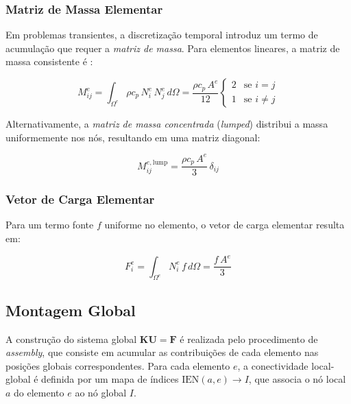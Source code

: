 \subsubsection{Matriz de Massa Elementar}

Em problemas transientes, a discretização temporal introduz um termo de acumulação que requer a \textit{matriz de massa}. Para elementos lineares, a matriz de massa consistente é \cite{Zienkiewicz2013}:

\begin{equation}
M_{ij}^e = \int_{\Omega^e} \rho c_p \, N_i^e \, N_j^e \, d\Omega = \frac{\rho c_p \, A^e}{12}
\begin{cases}
2 & \text{se } i = j \\
1 & \text{se } i \neq j
\end{cases}
\label{eq:massa_elementar}
\end{equation}

Alternativamente, a \textit{matriz de massa concentrada} (\textit{lumped}) distribui a massa uniformemente nos nós, resultando em uma matriz diagonal:

\begin{equation}
M_{ij}^{e,\text{lump}} = \frac{\rho c_p \, A^e}{3} \, \delta_{ij}
\label{eq:massa_lumped}
\end{equation}

\subsubsection{Vetor de Carga Elementar}

Para um termo fonte $f$ uniforme no elemento, o vetor de carga elementar resulta em:

\begin{equation}
F_i^e = \int_{\Omega^e} N_i^e \, f \, d\Omega = \frac{f \, A^e}{3}
\label{eq:carga_elementar}
\end{equation}

\subsection{Montagem Global}
\label{sec:montagem_global}

A construção do sistema global $\mathbf{K} \mathbf{U} = \mathbf{F}$ é realizada pelo procedimento de \textit{assembly}, que consiste em acumular as contribuições de cada elemento nas posições globais correspondentes. Para cada elemento $e$, a conectividade local-global é definida por um mapa de índices $\text{IEN}(a, e) \to I$, que associa o nó local $a$ do elemento $e$ ao nó global $I$.

